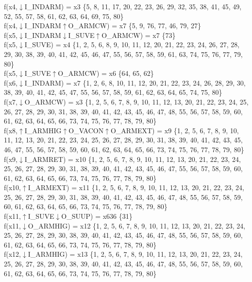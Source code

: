 f(x4,$\downarrow$I\_INDARM) = x3 \{5, 8, 11, 17, 20, 22, 23, 26, 29, 32, 35, 38, 41, 45, 49, 52, 55, 57, 58, 61, 62, 63, 64, 69, 75, 80\} \\  
f(x4,$\downarrow$I\_INDARM$\uparrow$O\_ARMCW) = x7 \{5, 9, 76, 77, 46, 79, 27\} \\  
f(x5,$\downarrow$I\_INDARM$\downarrow$I\_SUVE$\uparrow$O\_ARMCW) = x7 \{73\} \\  
f(x5,$\downarrow$I\_SUVE) = x4 \{1, 2, 5, 6, 8, 9, 10, 11, 12, 20, 21, 22, 23, 24, 26, 27, 28, 29, 30, 38, 39, 40, 41, 42, 45, 46, 47, 55, 56, 57, 58, 59, 61, 63, 74, 75, 76, 77, 79, 80\} \\  
f(x5,$\downarrow$I\_SUVE$\uparrow$O\_ARMCW) = x6 \{64, 65, 62\} \\  
f(x6,$\downarrow$I\_INDARM) = x7 \{1, 2, 6, 8, 10, 11, 12, 20, 21, 22, 23, 24, 26, 28, 29, 30, 38, 39, 40, 41, 42, 45, 47, 55, 56, 57, 58, 59, 61, 62, 63, 64, 65, 74, 75, 80\} \\  
f(x7,$\downarrow$O\_ARMCW) = x3 \{1, 2, 5, 6, 7, 8, 9, 10, 11, 12, 13, 20, 21, 22, 23, 24, 25, 26, 27, 28, 29, 30, 31, 38, 39, 40, 41, 42, 43, 45, 46, 47, 48, 55, 56, 57, 58, 59, 60, 61, 62, 63, 64, 65, 66, 73, 74, 75, 76, 77, 78, 79, 80\} \\  
f(x8,$\uparrow$I\_ARMHIG$\uparrow$O\_VACON$\uparrow$O\_ARMEXT) = x9 \{1, 2, 5, 6, 7, 8, 9, 10, 11, 12, 13, 20, 21, 22, 23, 24, 25, 26, 27, 28, 29, 30, 31, 38, 39, 40, 41, 42, 43, 45, 46, 47, 55, 56, 57, 58, 59, 60, 61, 62, 63, 64, 65, 66, 73, 74, 75, 76, 77, 78, 79, 80\} \\  
f(x9,$\downarrow$I\_ARMRET) = x10 \{1, 2, 5, 6, 7, 8, 9, 10, 11, 12, 13, 20, 21, 22, 23, 24, 25, 26, 27, 28, 29, 30, 31, 38, 39, 40, 41, 42, 43, 45, 46, 47, 55, 56, 57, 58, 59, 60, 61, 62, 63, 64, 65, 66, 73, 74, 75, 76, 77, 78, 79, 80\} \\  
f(x10,$\uparrow$I\_ARMEXT) = x11 \{1, 2, 5, 6, 7, 8, 9, 10, 11, 12, 13, 20, 21, 22, 23, 24, 25, 26, 27, 28, 29, 30, 31, 38, 39, 40, 41, 42, 43, 45, 46, 47, 48, 55, 56, 57, 58, 59, 60, 61, 62, 63, 64, 65, 66, 73, 74, 75, 76, 77, 78, 79, 80\} \\  
f(x11,$\uparrow$I\_SUVE$\downarrow$O\_SUUP) = x636 \{31\} \\  
f(x11,$\downarrow$O\_ARMHIG) = x12 \{1, 2, 5, 6, 7, 8, 9, 10, 11, 12, 13, 20, 21, 22, 23, 24, 25, 26, 27, 28, 29, 30, 38, 39, 40, 41, 42, 43, 45, 46, 47, 48, 55, 56, 57, 58, 59, 60, 61, 62, 63, 64, 65, 66, 73, 74, 75, 76, 77, 78, 79, 80\} \\  
f(x12,$\downarrow$I\_ARMHIG) = x13 \{1, 2, 5, 6, 7, 8, 9, 10, 11, 12, 13, 20, 21, 22, 23, 24, 25, 26, 27, 28, 29, 30, 38, 39, 40, 41, 42, 43, 45, 46, 47, 48, 55, 56, 57, 58, 59, 60, 61, 62, 63, 64, 65, 66, 73, 74, 75, 76, 77, 78, 79, 80\} \\  
